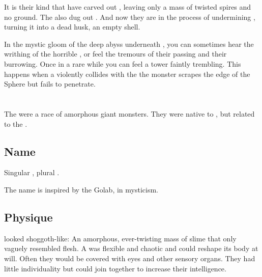 It is their kind that have carved out \Erebos, leaving only a mass of twisted spires and no ground. 
The also dug out \Nyx. And now they are in the process of undermining \Miith{}, turning it into a dead husk, an empty shell. 

In the mystic gloom of the deep abyss underneath \Nyx, you can sometimes hear the writhing of the horrible , or feel the tremours of their passing and their burrowing.
Once in a rare while you can feel a tower faintly trembling. 
This happens when a \noggyal{} violently collides with the \CrystalSphere{}\dash the monster scrapes the edge of the Sphere but fails to penetrate. 















\section{\Noggyal}
\index{\noggyal}
The \noggyaleth{} were a race of amorphous giant monsters. 
They were native to \Miith, but related to the \banes. 









\subsection{Name}
Singular \emph{\noggyal{}}, plural \emph{\noggyaleth{}}. 

The name is inspired by the \Qliphah{} Golab, in \Cabbalah mysticism.









\subsection{Physique}
\Noggyaleth looked shoggoth-like:
An amorphous, ever-twisting mass of slime that only vaguely resembled flesh.
A \noggyal was flexible and chaotic and could reshape its body at will.
Often they would be covered with eyes and other sensory organs.
They had little individuality but could join together to increase their intelligence.

